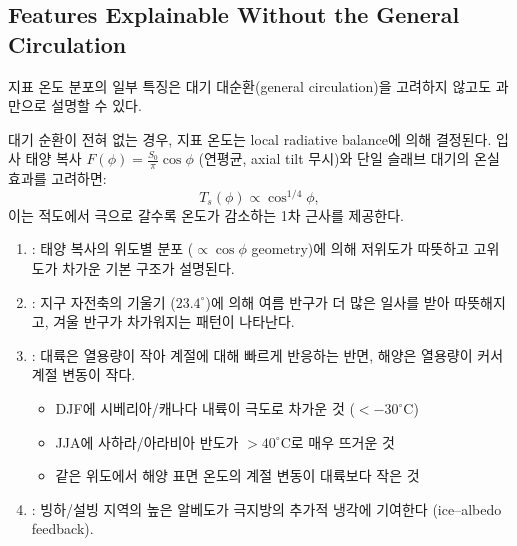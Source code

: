 \subsection{Features Explainable Without the General Circulation}

지표 온도 분포의 일부 특징은 대기 대순환(general circulation)을 고려하지 않고도
과 만으로 설명할 수 있다.

\begin{definition}
대기 순환이 전혀 없는 경우, 지표 온도는 local radiative balance에 의해 결정된다.
입사 태양 복사 $F(\phi) = \frac{S_{0}}{\pi}\cos\phi$ (연평균, axial tilt 무시)와
단일 슬래브 대기의 온실 효과를 고려하면:
\begin{equation}
  T_{s}(\phi) \propto \cos^{1/4}\phi,
  \label{eq:rad-equil-Ts}
\end{equation}
이는 적도에서 극으로 갈수록 온도가 감소하는 1차 근사를 제공한다.
\end{definition}

\begin{remark}
\begin{enumerate}
  \item {}: 태양 복사의 위도별 분포
        ($\propto \cos\phi$ geometry)에 의해 저위도가 따뜻하고 고위도가 차가운 기본 구조가 설명된다.
  \item {}: 지구 자전축의 기울기 ($23.4^{\circ}$)에 의해 여름 반구가
        더 많은 일사를 받아 따뜻해지고, 겨울 반구가 차가워지는 패턴이 나타난다.
  \item {}: 대륙은 열용량이 작아 계절에 대해
        빠르게 반응하는 반면, 해양은 열용량이 커서 계절 변동이 작다.
        \begin{itemize}
          \item DJF에 시베리아/캐나다 내륙이 극도로 차가운 것 ($<$$-30^{\circ}$C)
          \item JJA에 사하라/아라비아 반도가 $>$$40^{\circ}$C로 매우 뜨거운 것
          \item 같은 위도에서 해양 표면 온도의 계절 변동이 대륙보다 작은 것
        \end{itemize}
  \item {}: 빙하/설빙 지역의 높은 알베도가 극지방의
        추가적 냉각에 기여한다 (ice--albedo feedback).
\end{enumerate}
\end{remark}

